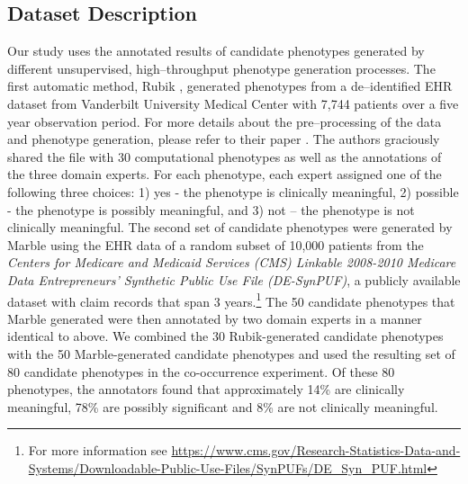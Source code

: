 \documentclass{sig-alternate-05-2015}
\newcommand{\kibitz}[2]{\ifnum\Comments=1\textcolor{#1}{#2}\fi}
\newcommand{\joyce}[1]{\kibitz{purple}      {[Joyce: #1]}}
\newcommand{\jette}[1]{\kibitz{red}      {[Jette: #1]}}
\begin{document}
\subsection{Dataset Description}
Our study uses the annotated results of candidate phenotypes generated by different unsupervised, high--throughput phenotype generation processes. The first automatic method, Rubik \cite{wang2015rubik},
generated phenotypes from a de--identified EHR dataset from Vanderbilt University Medical Center with 7,744 patients over a five year observation period.
For more details about the pre--processing of the data and phenotype generation, please refer to their paper \cite{wang2015rubik}.
The authors graciously shared the file with 30 computational phenotypes as well as the annotations of the three domain experts.
For each phenotype, each expert assigned one of the following three choices: 1) yes - the phenotype is clinically meaningful, 2) possible - the phenotype is possibly meaningful, and 3) not -- the phenotype is not clinically meaningful.
The second set of candidate phenotypes were generated by Marble \cite{Ho:2014da} using the EHR data of a random subset of 10,000 patients from the \emph{ Centers for Medicare and Medicaid Services (CMS) Linkable 2008-2010 Medicare Data Entrepreneurs' Synthetic Public Use File (DE-SynPUF)}, a publicly available dataset with claim records that span 3 years.\footnote{For more information see \url{https://www.cms.gov/Research-Statistics-Data-and-Systems/Downloadable-Public-Use-Files/SynPUFs/DE_Syn_PUF.html}}
The 50 candidate phenotypes that Marble generated were then annotated by two domain experts in a manner identical to above.
We combined the 30 Rubik-generated candidate phenotypes with the 50 Marble-generated candidate phenotypes and used the resulting set of 80 candidate phenotypes in the co-occurrence experiment.
Of these 80 phenotypes,  the annotators found that approximately 14\% are clinically meaningful, 78\% are possibly significant and 8\% are not clinically meaningful.

\end{document}
